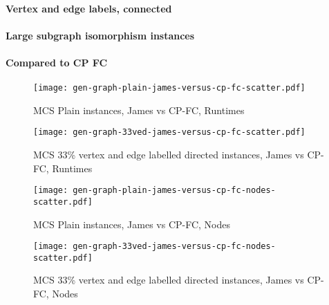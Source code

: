 \documentclass[letterpaper]{article}
\begin{document}
\paragraph{Vertex and edge labels, connected}

\paragraph{Large subgraph isomorphism instances}

\paragraph{Compared to CP FC}

\begin{figure}
    \centering
    \texttt{[image: gen-graph-plain-james-versus-cp-fc-scatter.pdf]}
    \caption{MCS Plain instances, James vs CP-FC, Runtimes}
\end{figure}

\begin{figure}
    \centering
    \texttt{[image: gen-graph-33ved-james-versus-cp-fc-scatter.pdf]}
    \caption{MCS 33\% vertex and edge labelled directed instances, James vs CP-FC, Runtimes}
\end{figure}

\begin{figure}
    \centering
    \texttt{[image: gen-graph-plain-james-versus-cp-fc-nodes-scatter.pdf]}
    \caption{MCS Plain instances, James vs CP-FC, Nodes}
\end{figure}

\begin{figure}
    \centering
    \texttt{[image: gen-graph-33ved-james-versus-cp-fc-nodes-scatter.pdf]}
    \caption{MCS 33\% vertex and edge labelled directed instances, James vs CP-FC, Nodes}
\end{figure}



\end{document}
